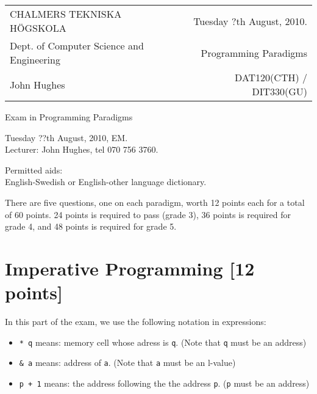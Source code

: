 \documentclass{article}
\begin{document}
\noindent
\begin{tabular}{lr}
CHALMERS TEKNISKA H\"OGSKOLA &Tuesday ?th August, 2010.\\
Dept. of Computer Science and Engineering & Programming Paradigms\\
John Hughes                  & DAT120(CTH) / DIT330(GU) \\
\end{tabular}

\vspace{2.5cm} \noindent
\begin{center} {\LARGE
Exam in Programming Paradigms}
\end{center}

\vspace{1.5cm}

\noindent
Tuesday ??th August, 2010, EM.\\
Lecturer: John Hughes, tel 070 756 3760.
\vspace{1cm}

\noindent
Permitted aids:\\
English-Swedish or English-other language dictionary.

There are five questions, one on each paradigm, worth 12 points each
for a total of 60 points. 24 points is required to pass (grade 3), 36
points is required for grade 4, and 48 points is required for grade 5.

\newcommand{\comment}[1]{\marginpar{#1}}

\newpage

\section{Imperative Programming [12 points]}

In this part of the exam, we use the following notation in expressions:

\begin{itemize}
\item
  \verb!* q! means: memory cell whose adress is \verb!q!. (Note that
  \verb!q! must be an address)
\item
  \verb!& a! means: address of \verb!a!. (Note that \verb!a! must be
  an l-value)
\item
  \verb!p + 1! means: the address following the the address \verb!p!. (\verb!p! must be an address)
\end{itemize}
\end{document}
